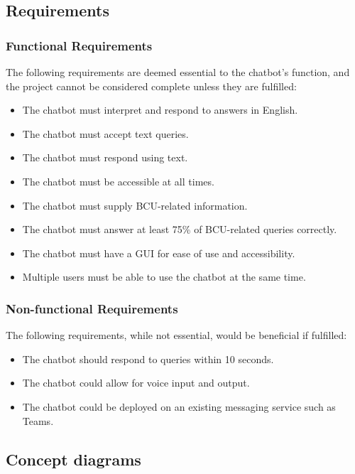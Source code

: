 \subsection{Requirements}\label{sec:Requirements}
\subsubsection{Functional Requirements}
The following requirements are deemed essential to the chatbot's function, and the project cannot be considered complete unless they 
are fulfilled:

\begin{itemize}
    \item The chatbot must interpret and respond to answers in English.
    \item The chatbot must accept text queries.
    \item The chatbot must respond using text.
    \item The chatbot must be accessible at all times.
    \item The chatbot must supply BCU-related information.
    \item The chatbot must answer at least 75\% of BCU-related queries correctly.
    \item The chatbot must have a GUI for ease of use and accessibility.
    \item Multiple users must be able to use the chatbot at the same time.
\end{itemize}

\subsubsection{Non-functional Requirements}
The following requirements, while not essential, would be beneficial if fulfilled:

\begin{itemize}
    \item The chatbot should respond to queries within 10 seconds.
    \item The chatbot could allow for voice input and output.
    \item The chatbot could be deployed on an existing messaging service such as Teams.
\end{itemize}

\subsection{Concept diagrams}

